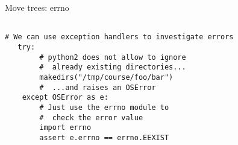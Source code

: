 \begin{frame}[fragile]{Move trees: errno}
\begin{verbatim}

# We can use exception handlers to investigate errors
   try:
        # python2 does not allow to ignore
        #  already existing directories...
        makedirs("/tmp/course/foo/bar")
        #  ...and raises an OSError
    except OSError as e:
        # Just use the errno module to
        #  check the error value
        import errno
        assert e.errno == errno.EEXIST
\end{verbatim}
\end{frame}

